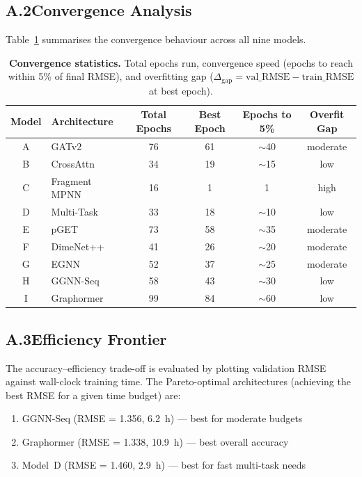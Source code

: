 \documentclass[11pt]{article}
\begin{document}
\subsection*{A.2\quad Convergence Analysis}

Table~\ref{tab:app_convergence} summarises the convergence behaviour
across all nine models.

\begin{table}[H]
\small
\centering
\caption{\textbf{Convergence statistics.}
  Total epochs run, convergence speed (epochs to reach within 5\% of
  final RMSE), and overfitting gap ($\Delta_{\mathrm{gap}} =
  \text{val\_RMSE} - \text{train\_RMSE}$ at best epoch).}
\label{tab:app_convergence}
\begin{tabular}{clcccc}
\toprule
\textbf{Model} & \textbf{Architecture}
  & \textbf{Total Epochs} & \textbf{Best Epoch}
  & \textbf{Epochs to 5\%} & \textbf{Overfit Gap} \\
\midrule
A & GATv2            &  76 &  61 & $\sim$40 & moderate \\
B & CrossAttn        &  34 &  19 & $\sim$15 & low \\
C & Fragment MPNN    &  16 &   1 & 1        & high \\
D & Multi-Task       &  33 &  18 & $\sim$10 & low \\
E & pGET             &  73 &  58 & $\sim$35 & moderate \\
F & DimeNet++        &  41 &  26 & $\sim$20 & moderate \\
G & EGNN             &  52 &  37 & $\sim$25 & moderate \\
H & GGNN-Seq         &  58 &  43 & $\sim$30 & low \\
I & Graphormer       &  99 &  84 & $\sim$60 & low \\
\bottomrule
\end{tabular}
\end{table}

\subsection*{A.3\quad Efficiency Frontier}

The accuracy--efficiency trade-off is evaluated by plotting validation
RMSE against wall-clock training time.
The Pareto-optimal architectures (achieving the best RMSE for a given
time budget) are:
\begin{enumerate}[leftmargin=1.5em]
  \item GGNN-Seq (RMSE = 1.356, 6.2~h) --- best for moderate budgets
  \item Graphormer (RMSE = 1.338, 10.9~h) --- best overall accuracy
  \item Model~D (RMSE = 1.460, 2.9~h) --- best for fast multi-task needs
\end{enumerate}
\end{document}
